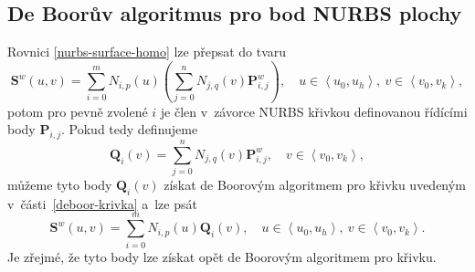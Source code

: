 \subsection{De Boorův algoritmus pro bod NURBS plochy}

Rovnici \eqref{nurbs-surface-homo} lze přepsat do tvaru
\begin{equation}
\mathbf{S}^w\left(u,v\right)=\sum _{i=0}^{m}{N}_{i,p}\left(u\right)\left(\sum _{j=0}^{n}{N}_{j,q}\left(v\right)\mathbf{P}^w_{i,j}\right), \quad u \in \left\langle u_0,u_h \right\rangle,\ v \in \left\langle v_0,v_k \right\rangle,
\end{equation}
potom pro pevně zvolené $i$ je člen v~závorce NURBS křivkou definovanou řídícími body $\mathbf{P}_{i,j}$. Pokud tedy definujeme
\begin{equation}
\mathbf{Q}_i\left(v\right)=\sum _{j=0}^{n}{N}_{j,q}\left(v\right)\mathbf{P}^w_{i,j},\quad v \in \left\langle v_0,v_k \right\rangle,
\end{equation}
můžeme tyto body $\mathbf{Q}_i\left(v\right)$ získat de Boorovým algoritmem pro křivku uvedeným v~části~\ref{deboor-krivka} a~lze psát
\begin{equation}
\mathbf{S}^w\left(u,v\right)=\sum _{i=0}^{m}{N}_{i,p}\left(u\right)\mathbf{Q}_i\left(v\right), \quad u \in \left\langle u_0,u_h \right\rangle,\ v \in \left\langle v_0,v_k \right\rangle.
\end{equation}
Je zřejmé, že tyto body lze získat opět de Boorovým algoritmem pro křivku.

